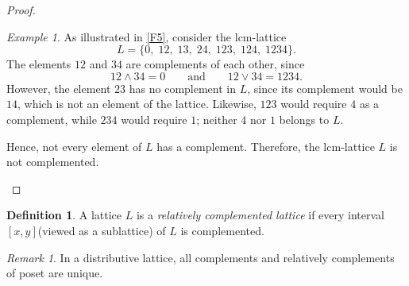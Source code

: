 \documentclass[11pt]{amsart}
\newcommand{\lcm}{\mathrm{lcm}}
\newcommand{\LC}{\mathcal{L}}
\theoremstyle{plain}
\newtheorem{lemma}{Lemma}
\numberwithin{lemma}{\DefaultNumberTheoremWithin}
\numberwithin{claim}{\DefaultNumberTheoremWithin}
\newtheorem{theorem}{Theorem}
\numberwithin{theorem}{\DefaultNumberTheoremWithin}
\numberwithin{corollary}{\DefaultNumberTheoremWithin}
\numberwithin{proposition}{\DefaultNumberTheoremWithin}
\numberwithin{conjecture}{\DefaultNumberTheoremWithin}
\theoremstyle{definition}
\newtheorem{definition}{Definition}
\numberwithin{definition}{\DefaultNumberTheoremWithin}
\theoremstyle{definition}
\numberwithin{question}{\DefaultNumberTheoremWithin}
\theoremstyle{definition}
\numberwithin{problem}{\DefaultNumberTheoremWithin}
\theoremstyle{remark}
\newtheorem{remark}{Remark}
\numberwithin{remark}
     {\DefaultNumberTheoremWithin}
\theoremstyle{remark}
\newtheorem{example}{Example}
\numberwithin{example}{\DefaultNumberTheoremWithin}
\begin{document}
\begin{proof}
\begin{example}
As illustrated in \ref{F5}, consider the $\lcm$-lattice
\[
L=\{0,\;12,\;13,\;24,\;123,\;124,\;1234\}.
\]
The elements $12$ and $34$ are complements of each other, since
\[
12\wedge 34=0
\qquad\text{and}\qquad
12\vee 34=1234.
\]
However, the element $23$ has no complement in $L$, since its complement would be $14$, which is not an element of the lattice.
Likewise, $123$ would require $4$ as a complement, while $234$ would
require $1$; neither $4$ nor $1$ belongs to $L$.

Hence, not every element of $L$ has a complement. Therefore, the
$\lcm$-lattice $L$ is not complemented.
\end{example}

\end{proof}


\begin{definition}
    A lattice $L$ is a \emph{relatively complemented lattice} if every interval $[x, y]$(viewed as a sublattice) of $L$ is complemented. 
\end{definition}

\begin{remark}
    In a distributive lattice, all complements and relatively complements of poset are unique. 
\end{remark}
\end{document}
